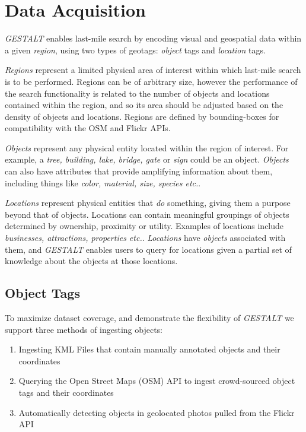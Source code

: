 \section{Data Acquisition}
\label{section:data}

\emph{GESTALT} enables last-mile search by encoding visual and geospatial data within a given \emph{region}, using two types of geotags: \emph{object} tags and \emph{location} tags.

\emph{Regions} represent a limited physical area of interest within which last-mile search is to be performed. 
Regions can be of arbitrary size, however the performance of the search functionality is related to the number of objects and locations contained within the region, and so its area should be adjusted based on the density of objects and locations. 
Regions are defined by bounding-boxes for compatibility with the OSM and Flickr APIs.

\emph{Objects} represent any physical entity located within the region of interest. 
For example, a \textit{tree, building, lake, bridge, gate} or \textit{sign} could be an object. 
\textit{Objects} can also have attributes that provide amplifying information about them, including things like \textit{color, material, size, species etc.}. 

\emph{Locations} represent physical entities that \textit{do} something, giving them a purpose beyond that of objects. 
Locations can contain meaningful groupings of objects determined by ownership, proximity or utility. 
Examples of locations include \textit{businesses, attractions, properties etc.}. 
\textit{Locations} have \textit{objects} associated with them, and \emph{GESTALT} enables users to query for locations given a partial set of knowledge about the objects at those locations.

\subsection{Object Tags}
To maximize dataset coverage, and demonstrate the flexibility of \emph{GESTALT} we support three methods of ingesting objects:
\begin{enumerate}
    \item Ingesting KML Files that contain manually annotated objects and their coordinates 
    \item Querying the Open Street Maps (OSM) API to ingest crowd-sourced object tags and their coordinates
    \item Automatically detecting objects in geolocated photos pulled from the Flickr API 
\end{enumerate}

